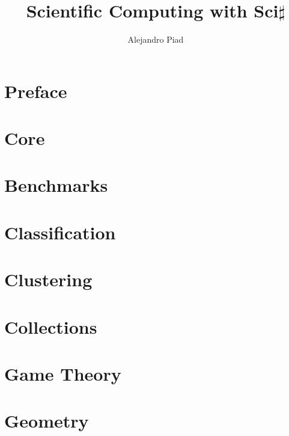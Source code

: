 \documentclass[10pt,a4paper]{report}
\author{Alejandro Piad}
\title{\Huge Scientific Computing with Sci$\sharp$}
\begin{document}

\maketitle
\tableofcontents

\chapter*{Preface}
 

\chapter{Core}
 

\chapter{Benchmarks}

\chapter{Classification}

\chapter{Clustering}

\chapter{Collections}

\chapter{Game Theory}

\chapter{Geometry}
\end{document}
